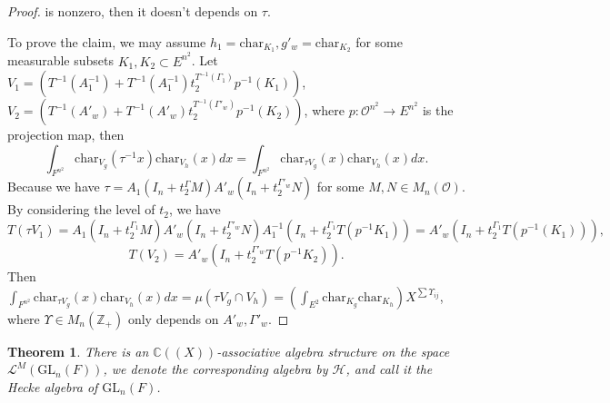 \documentclass{amsart}
\newtheorem{theorem}{Theorem}[section]
\theoremstyle{definition}
\theoremstyle{remark}
\numberwithin{equation}{section}
\def  \Char     {\mathrm{char}}
\def  \GL        {\mathrm{GL}}
\def  \ch       {\mathcal{H}}
\def  \cl       {\mathcal{L}}
\def  \co       {\mathcal{O}}
\def  \bc       {\mathbb{C}}
\def  \bz       {\mathbb{Z}}
\begin{document}
\begin{proof}
     is nonzero,  then it doesn't depends on $\tau$.



To prove the claim,	 we may assume $h_1= \Char_{K_1}, g'_w= \Char_{K_2}$ for some measurable  subsets  $K_1, K_2 \subset E^{n^2}$.  Let $V_1= (T^{-1}(A_1^{-1}) + T^{-1}(A^{-1}_1 )t_2^{T^{-1}(\Gamma_1)}  p^{-1}(K_1))$, $V_2= (T^{-1}(A'_w) + T^{-1} (A'_w)t_2^{T^{-1}(\Gamma'_w)}  p^{-1}(K_2))$, where $p: \co^{n^2} \to E^{n^2}$ is the projection map, then
	$$
  \int_{F^{n^2} }  \Char_{V_g}(\tau^{-1} x ) \Char_{V_h}( x)   dx =\int_{F^{n^2} }  \Char_{\tau V_g}(x ) \Char_{V_h}( x)dx.
	$$
Because we have $\tau =A_1(I_n + t_2^{\Gamma}M ) A'_w(I_n + t_2^{\Gamma'_w}N)$ for some $M, N \in M_n(\co)$.  By considering  the level of $t_2$, we have
	$$
T(	\tau V_1)  =  A_1(I_n + t_2^{\Gamma_1}M ) A'_w(I_n + t_2^{\Gamma'_w}N) A_1^{-1}(I_n + t_2^{\Gamma_1} T(p^{-1}K_1))=A'_w(I_n + t_2^{\Gamma_1}T(p^{-1}(K_1))) ,
	$$
	$$
 T(	V_2) =   A'_w (I_n+t_2^{\Gamma'_w}T(p^{-1}K_2)).
	$$
Then $\int_{F^{n^2} }  \Char_{\tau V_g}(x ) \Char_{V_h}( x)   dx =\mu(\tau V_g \cap V_h) = (\int_{E^2} \Char_{K_g} \Char_{K_h})X^{\sum \Upsilon_{ij}}$, where $\Upsilon \in M_n(\bz_+)$  only depends on $A'_w, \Gamma'_w$.
\end{proof}



\begin{theorem}
	 There is an $\bc((X))$-associative algebra structure on the space $\cl^M(\GL_n(F))$,  we denote the corresponding algebra by $\ch$, and call it the Hecke algebra of $\GL_n(F)$.
\end{theorem}
\end{document}
